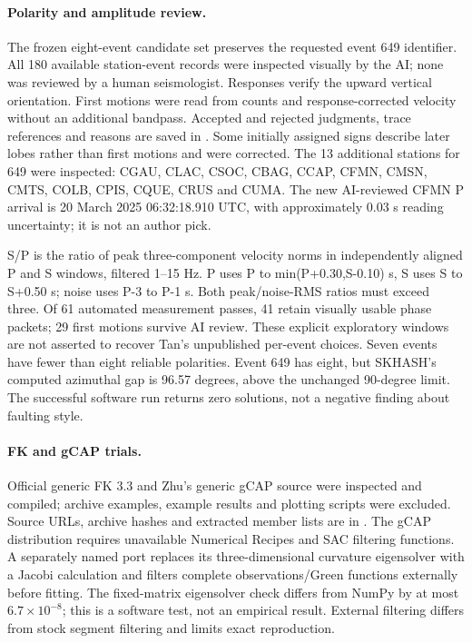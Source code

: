 \paragraph{Polarity and amplitude review.}
The frozen eight-event candidate set preserves the requested event 649 identifier. All 180 available station-event records were inspected visually by the AI; none was reviewed by a human seismologist. Responses verify the upward vertical orientation. First motions were read from counts and response-corrected velocity without an additional bandpass. Accepted and rejected judgments, trace references and reasons are saved in . Some initially assigned signs describe later lobes rather than first motions and were corrected. The 13 additional stations for 649 were inspected: CGAU, CLAC, CSOC, CBAG, CCAP, CFMN, CMSN, CMTS, COLB, CPIS, CQUE, CRUS and CUMA. The new AI-reviewed CFMN P arrival is 20 March 2025 06:32:18.910 UTC, with approximately 0.03 s reading uncertainty; it is not an author pick.

S/P is the ratio of peak three-component velocity norms in independently aligned P and S windows, filtered 1--15 Hz. P uses P to min(P+0.30,S-0.10) s, S uses S to S+0.50 s; noise uses P-3 to P-1 s. Both peak/noise-RMS ratios must exceed three. Of 61 automated measurement passes, 41 retain visually usable phase packets; 29 first motions survive AI review. These explicit exploratory windows are not asserted to recover Tan's unpublished per-event choices. Seven events have fewer than eight reliable polarities. Event 649 has eight, but SKHASH's computed azimuthal gap is 96.57 degrees, above the unchanged 90-degree limit. The successful software run returns zero solutions, not a negative finding about faulting style.

\paragraph{FK and gCAP trials.}
Official generic FK 3.3 and Zhu's generic gCAP source were inspected and compiled; archive examples, example results and plotting scripts were excluded. Source URLs, archive hashes and extracted member lists are in . The gCAP distribution requires unavailable Numerical Recipes and SAC filtering functions. A separately named port replaces its three-dimensional curvature eigensolver with a Jacobi calculation and filters complete observations/Green functions externally before fitting. The fixed-matrix eigensolver check differs from NumPy by at most $6.7\times10^{-8}$; this is a software test, not an empirical result. External filtering differs from stock segment filtering and limits exact reproduction.

